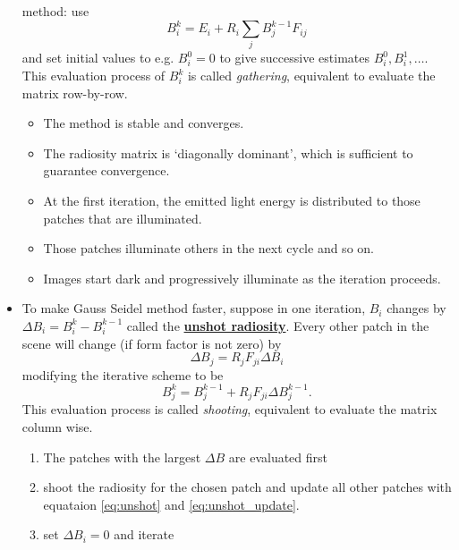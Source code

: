 \documentclass[twocolumn,landscape,10pt]{article}
\theoremstyle{definition}
\begin{document}
\begin{itemize}
        method: use
        \[
            B_i^k=E_i+R_i\sum_jB_j^{k-1}F_{ij}
        \]
        and set initial values to e.g. $B_i^0=0$
        to give successive estimates $B_i^0,B_i^1,\ldots$.
        This evaluation process of $B_i^k$ is called \emph{gathering},
        equivalent to evaluate the matrix row-by-row.
        \begin{itemize}
            \item The method is stable and converges.
            \item The radiosity matrix is `diagonally dominant', which is
                sufficient to guarantee convergence.
            \item At the first iteration, the emitted light energy is
                distributed to those patches that are illuminated.
            \item Those patches illuminate others in the next cycle and so on.
            \item Images start dark and progressively illuminate as the
                iteration proceeds.
        \end{itemize} 
    \item To make Gauss Seidel method faster, suppose in one iteration,
        $B_i$ changes by $\Delta B_i=B_i^k-B_i^{k-1}$ called the 
        \underline{\textbf{unshot radiosity}}.
        Every other patch in the scene will change (if form factor is not zero) by
        \begin{equation}\label{eq:unshot}
            \Delta B_j=R_jF_{ji}\Delta B_i
        \end{equation} 
        modifying the iterative scheme to be
        \begin{equation}\label{eq:unshot_update}
            B_j^k=B_j^{k-1}+R_jF_{ji}\Delta B_j^{k-1}.
        \end{equation} 
        This evaluation process is called \emph{shooting}, equivalent
        to evaluate the matrix column wise.
        \begin{enumerate}
            \item The patches with the largest $\Delta B$ are evaluated first
            \item shoot the radiosity for the chosen patch and update all other
                patches with equataion \eqref{eq:unshot} and
                \eqref{eq:unshot_update}.
            \item set $\Delta B_i=0$ and iterate
        \end{enumerate}  
\end{itemize} 
\end{document}
